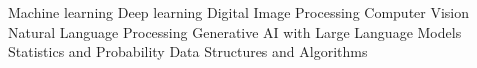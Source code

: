 Machine learning \hspace{0.8cm} Deep learning \hspace{0.8cm} Digital Image Processing \hspace{0.8cm}
Computer Vision \hspace{0.8cm} Natural Language Processing \hspace{0.8cm} 
\hspace{0.8cm} Generative AI with Large Language Models \hspace{0.8cm} 
Statistics and Probability \hspace{0.8cm} 
\hspace{0.5cm} Data Structures and Algorithms